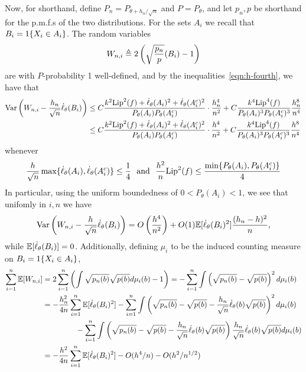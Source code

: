 Now, for shorthand, define $P_n = P_{\theta + h_n / \sqrt{n}}$ and $P =
P_\theta$, and let $p_n, p$ be shorthand for the p.m.f.s of the two
distributions.  For the sets $A_i$ we recall that $B_i = 1\!\left\{X_i \in
  A_i\right\}$.  The random variables
\begin{equation*}
  W_{n,i} \triangleq 2 \left(\sqrt{\frac{p_n}{p}}(B_i) - 1\right)
\end{equation*}
are with $P$-probability 1 well-defined, and by the
inequalities~\eqref{eqn:h-fourth}, we have
that
\begin{align*}
  \textup{Var}\left(W_{n,i} - \frac{h_n}{\sqrt{n}} \dot{\ell}_\theta(B_i)\right)
  & \le 
  C \frac{k^2 {\rm \textup{Lip}}^2(f) + \dot{\ell}_\theta(A_i)^2
  + \dot{\ell}_\theta(A_i^c)^2}{P_\theta(A_i) P_\theta(A_i^c)}
  \cdot \frac{h_n^4}{n^2}
  + C \frac{k^4 {\rm \textup{Lip}}^4(f)}{
    P_\theta(A_i)^3 P_\theta(A_i^c)^3}
  \frac{h_n^8}{n^4} \\
  & \le 
  C \frac{k^2 {\rm \textup{Lip}}^2(f) + \dot{\ell}_\theta(A_i)^2
  + \dot{\ell}_\theta(A_i^c)^2}{P_\theta(A_i) P_\theta(A_i^c)}
  \cdot \frac{h^4}{n^2}
  + C \frac{k^4 {\rm \textup{Lip}}^4(f)}{
    P_\theta(A_i)^3 P_\theta(A_i^c)^3}
  \frac{h^8}{n^4}
\end{align*}
whenever
\begin{equation*}
  \frac{h}{\sqrt{n}} \max\{\dot{\ell}_\theta(A_i),
  \dot{\ell}_\theta(A_i^c)\}
  \le \frac{1}{4}
  ~~ \mbox{and} ~~
  \frac{h^2}{n} {\rm \textup{Lip}}^2(f)
  \le \frac{\min\{P_\theta(A_i), P_\theta(A_i^c)\}}{4}
\end{equation*}
In particular, using the uniform boundedness of $0 < P_\theta(A_i) < 1$,
we see that unifomly in $i, n$ we have
\begin{equation*}
  \textup{Var}\left(W_{n,i} - \frac{h}{\sqrt{n}} \dot{\ell}_\theta(B_i)\right)
  = O\left(\frac{h^4}{n^2}\right)
  + O(1) \mathbb{E}[\dot{\ell}_\theta(B_i)^2]
  \frac{(h_n - h)^2}{n},
\end{equation*}
while $\mathbb{E}[\dot{\ell}_\theta(B_i)] = 0$. Additionally, defining $\mu_i$ to be the
induced counting measure on $B_i = 1\!\left\{X_i \in A_i\right\}$,
\begin{align*}
  \sum_{i = 1}^n \mathbb{E}[W_{n,i}]
  & = 2\sum_{i = 1}^n
  \left(\int \sqrt{p_n(b)} \sqrt{p(b)} d\mu_i(b) - 1 \right)
  = -\sum_{i = 1}^n \int \left(\sqrt{p_n(b)} - \sqrt{p(b)}\right)^2
  d\mu_i(b) \\
  & = -\frac{h_n^2}{4 n} \sum_{i = 1}^n \mathbb{E}[\dot{\ell}_\theta(B_i)^2]
  - \sum_{i = 1}^n \int \left(\sqrt{p_n(b)} - \sqrt{p(b)}
  - \frac{h_n}{\sqrt{n}} \dot{\ell}_\theta(b) \sqrt{p(b)}\right)^2 d\mu_i(b) \\
  & \qquad \qquad ~
  - \sum_{i = 1}^n \int \left(\sqrt{p_n(b)} - \sqrt{p(b)}
  - \frac{h_n}{\sqrt{n}} \dot{\ell}_\theta(b) \sqrt{p(b)}\right)
  \frac{h_n}{\sqrt{n}} \dot{\ell}_\theta(b) \sqrt{p(b)}d\mu_i(b) \\
  & = -\frac{h^2}{4n} \sum_{i = 1}^n \mathbb{E}[\dot{\ell}_\theta(B_i)^2]
  - O(h^4 / n) - O(h^2 / n^{1/2})
\end{align*}
